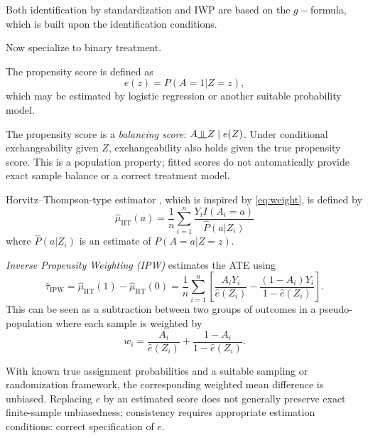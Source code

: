 \documentclass[11pt,twoside]{article}
\begin{document}
\begin{remark}
    Both identification by standardization and IWP are based on the $g-$formula, which is built upon the identification conditions.
\end{remark}


Now specialize to binary treatment.
\begin{definition}
    The propensity score \cite{rosenbaum1983central} is defined as
    \[
    e(z) = P(A=1|Z=z),
    \]
    which may be estimated by logistic regression or another suitable probability model.
\end{definition}

The propensity score is a \emph{balancing score}: $A\indep Z\mid e(Z)$. Under conditional exchangeability given $Z$, exchangeability also holds given the true propensity score. This is a population property; fitted scores do not automatically provide exact sample balance or a correct treatment model.

Horvitz--Thompson-type estimator \cite{Horvitz01121952}, which is inspired by \eqref{eq:weight}, is defined by 
\begin{equation}
    \label{eq:HT}
    \boxed{
    \hat{\mu}_{\mathrm{HT}}(a) = \frac1n\sum_{i=1}^n
\frac{Y_iI(A_i=a)}{\widehat P(a|Z_i)}}
\end{equation}
where $\widehat P(a|Z_i)$ is an estimate of $P(A=a|Z=z)$.

\emph{Inverse Propensity Weighting (IPW)} estimates the ATE using
\[
\boxed{
\widehat{\tau}_{\mathrm{IPW}}= \hat{\mu}_{\mathrm{HT}}(1) - \hat{\mu}_{\mathrm{HT}}(0)
=
\frac1n\sum_{i=1}^n
\left[
\frac{A_iY_i}{\widehat e(Z_i)}
-
\frac{(1-A_i)Y_i}{1-\widehat e(Z_i)}
\right].}
\]
This can be seen as a subtraction between two groups of outcomes in a pseudo-population where each sample is weighted by
\[
\boxed{
w_i=\frac{A_i}{\widehat e(Z_i)}+
\frac{1-A_i}{1-\widehat e(Z_i)}.
}
\]

With known true assignment probabilities and a suitable sampling or randomization framework, the corresponding weighted mean difference is unbiased. Replacing $e$ by an estimated score does not generally preserve exact finite-sample unbiasedness; consistency requires appropriate estimation conditions: correct specification of $e$.
\end{document}
